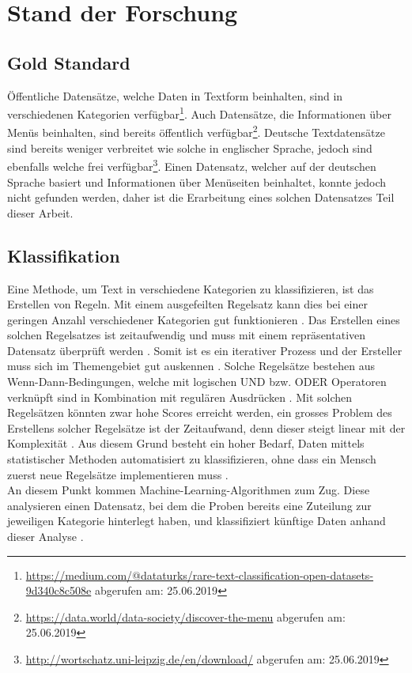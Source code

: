 \chapter{Stand der Forschung}
\section{Gold Standard}
Öffentliche Datensätze, welche Daten in Textform beinhalten, sind in verschiedenen Kategorien verfügbar\footnote{\url{https://medium.com/@dataturks/rare-text-classification-open-datasets-9d340c8c508e} abgerufen am: 25.06.2019}.
Auch Datensätze, die Informationen über Menüs beinhalten, sind bereits öffentlich verfügbar\footnote{\url{https://data.world/data-society/discover-the-menu} abgerufen am: 25.06.2019}.
Deutsche Textdatensätze sind bereits weniger verbreitet wie solche in englischer Sprache, jedoch sind ebenfalls welche frei verfügbar\footnote{\url{http://wortschatz.uni-leipzig.de/en/download/} abgerufen am: 25.06.2019}.
Einen Datensatz, welcher auf der deutschen Sprache basiert und Informationen über Menüseiten beinhaltet, konnte jedoch nicht gefunden werden, daher ist die Erarbeitung eines solchen Datensatzes Teil dieser Arbeit.
\section{Klassifikation}
Eine Methode, um Text in verschiedene Kategorien zu klassifizieren, ist das Erstellen von Regeln.
Mit einem ausgefeilten Regelsatz kann dies bei einer geringen Anzahl verschiedener Kategorien gut funktionieren \cite[p.125]{jackson2007natural}.
Das Erstellen eines solchen Regelsatzes ist zeitaufwendig und muss mit einem repräsentativen Datensatz überprüft werden \cite[p.125]{jackson2007natural}.
Somit ist es ein iterativer Prozess und der Ersteller muss sich im Themengebiet gut auskennen \cite[p.125]{jackson2007natural}.
Solche Regelsätze bestehen aus \glqq Wenn-Dann\grqq-Bedingungen, welche mit logischen \glqq UND\grqq{} bzw. \glqq ODER\grqq{} Operatoren verknüpft sind in Kombination mit regulären Ausdrücken \cite[p.126]{jackson2007natural}.
Mit solchen Regelsätzen könnten zwar hohe Scores erreicht werden, ein grosses Problem des Erstellens solcher Regelsätze ist der Zeitaufwand, denn dieser steigt linear mit der Komplexität \cite[p.127]{jackson2007natural}.
Aus diesem Grund besteht ein hoher Bedarf, Daten mittels statistischer Methoden automatisiert zu klassifizieren, ohne dass ein Mensch zuerst neue Regelsätze implementieren muss \cite[p.127]{jackson2007natural}.\\
An diesem Punkt kommen Machine-Learning-Algorithmen zum Zug.
Diese analysieren einen Datensatz, bei dem die Proben bereits eine Zuteilung zur jeweiligen Kategorie hinterlegt haben, und klassifiziert künftige Daten anhand dieser Analyse \cite[p.127]{jackson2007natural}. 
